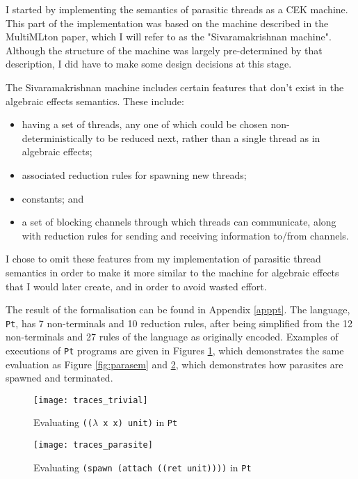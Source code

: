 \documentclass[12pt,a4paper,twoside,openright]{report}
\begin{document}
I started by implementing the semantics of parasitic threads as a CEK machine. This part of the implementation was based on the machine described in the MultiMLton paper\cite{Siv2014}, which I will refer to as the "Sivaramakrishnan machine". Although the structure of the machine was largely pre-determined by that description, I did have to make some design decisions at this stage.

The Sivaramakrishnan machine includes certain features that don't exist in the algebraic effects semantics. These include:

\begin{itemize}
\item having a set of threads, any one of which could be chosen non-deterministically to be reduced next, rather than a single thread as in algebraic effects;
\item associated reduction rules for spawning new threads;
\item constants; and
\item a set of blocking channels through which threads can communicate, along with reduction rules for sending and receiving information to/from channels.
\end{itemize}

I chose to omit these features from my implementation of parasitic thread semantics in order to make it more similar to the machine for algebraic effects that I would later create, and in order to avoid wasted effort.

The result of the formalisation can be found in Appendix \ref{apppt}. The language, \texttt{Pt}, has 7 non-terminals and 10 reduction rules, after being simplified from the 12 non-terminals and 27 rules of the language as originally encoded. Examples of executions of \texttt{Pt} programs are given in Figures \ref{fig:traces_trivial}, which demonstrates the same evaluation as Figure \ref{fig:parasem} and \ref{fig:traces_parasite}, which demonstrates how parasites are spawned and terminated. 

\begin{figure}
\centering
\caption{Evaluating \texttt{(($\lambda$ x x) unit)} in \texttt{Pt}}
\label{fig:traces_trivial}
\texttt{[image: traces\_trivial]}
\end{figure}

\begin{figure}
\centering
\caption{Evaluating \texttt{(spawn (attach ((ret unit))))} in \texttt{Pt}}
\label{fig:traces_parasite}
\texttt{[image: traces\_parasite]}
\end{figure}
\end{document}

